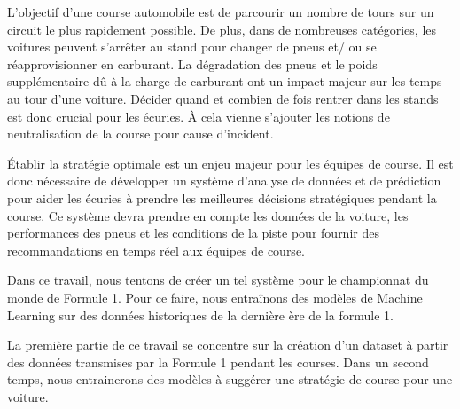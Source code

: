 L'objectif d'une course automobile est de parcourir un nombre de tours sur un circuit le plus
rapidement possible. De plus, dans de nombreuses catégories, les voitures peuvent s'arrêter au stand pour changer de pneus et/ ou se réapprovisionner en carburant.
La dégradation des pneus et le poids supplémentaire dû à la charge de carburant ont un impact majeur sur les temps au tour d'une voiture.
Décider quand et combien de fois rentrer dans les stands est donc crucial pour les écuries. À cela vienne s'ajouter les notions de neutralisation de la course pour cause d'incident.

Établir la stratégie optimale est un enjeu majeur pour les équipes de course. Il est donc nécessaire de développer un système d'analyse de données et de prédiction pour aider les écuries à prendre les meilleures décisions stratégiques pendant la course.
Ce système devra prendre en compte les données de la voiture, les performances des pneus et les conditions de la piste pour fournir des recommandations en temps réel aux équipes de course.

Dans ce travail, nous tentons de créer un tel système pour le championnat du monde de Formule 1.
Pour ce faire, nous entraînons des modèles de Machine Learning sur des données historiques de la dernière ère de la formule 1.

La première partie de ce travail se concentre sur la création d'un dataset à partir des données transmises par la Formule 1 pendant les courses.
Dans un second temps, nous entrainerons des modèles à suggérer une stratégie de course pour une voiture.